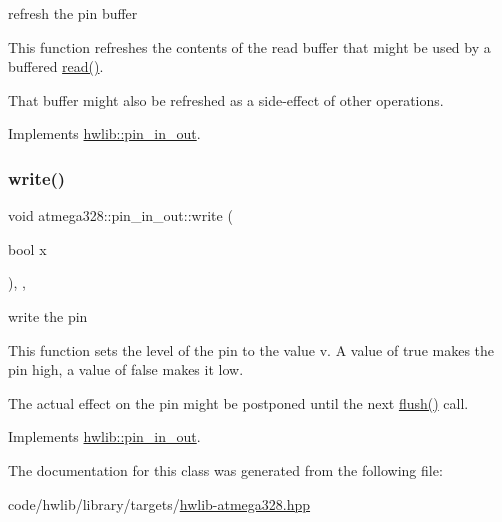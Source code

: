 refresh the pin buffer

This function refreshes the contents of the read buffer that might be used by a buffered \hyperlink{classatmega328_1_1pin__in__out_ad30bd54f54fd54163ffb97e59ab52498}{read()}.

That buffer might also be refreshed as a side-\/effect of other operations. 

Implements \hyperlink{classhwlib_1_1pin__in__out_a8815baac4e5193ec68795956f5e363a6}{hwlib\+::pin\+\_\+in\+\_\+out}.

\mbox{\label{classatmega328_1_1pin__in__out_a2d6c30a028b57e2278e0f0024ba25460}} 
\subsubsection{\texorpdfstring{write()}{write()}}
{\footnotesize\ttfamily void atmega328\+::pin\+\_\+in\+\_\+out\+::write (\begin{DoxyParamCaption}\item[{bool}]{x }\end{DoxyParamCaption})\hspace{0.3cm}{\ttfamily [inline]}, {\ttfamily [override]}, {\ttfamily [virtual]}}

write the pin

This function sets the level of the pin to the value v. A value of true makes the pin high, a value of false makes it low.

The actual effect on the pin might be postponed until the next \hyperlink{classatmega328_1_1pin__in__out_ab8c8298dc5d904dbc49f8b92e39abb7b}{flush()} call. 

Implements \hyperlink{classhwlib_1_1pin__in__out_aa5e2adcb5707f86c20b6306fc09f1582}{hwlib\+::pin\+\_\+in\+\_\+out}.



The documentation for this class was generated from the following file\+:\begin{DoxyCompactItemize}
\item 
code/hwlib/library/targets/\hyperlink{hwlib-atmega328_8hpp}{hwlib-\/atmega328.\+hpp}\end{DoxyCompactItemize}
